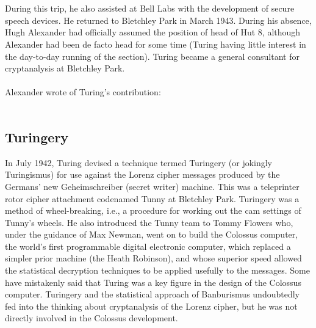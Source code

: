 \documentclass{article}
\begin{document}
\\\\
During this trip, he also assisted at Bell Labs with the development of secure speech devices. He returned to Bletchley Park in March 1943. During his absence, Hugh Alexander had officially assumed the position of head of Hut 8, although Alexander had been de facto head for some time (Turing having little interest in the day-to-day running of the section). Turing became a general consultant for cryptanalysis at Bletchley Park.
\\\\
Alexander wrote of Turing's contribution:
\\\\

\subsection{Turingery}

In July 1942, Turing devised a technique termed Turingery (or jokingly Turingismus) for use against the Lorenz cipher messages produced by the Germans' new Geheimschreiber (secret writer) machine. This was a teleprinter rotor cipher attachment codenamed Tunny at Bletchley Park. Turingery was a method of wheel-breaking, i.e., a procedure for working out the cam settings of Tunny's wheels. He also introduced the Tunny team to Tommy Flowers who, under the guidance of Max Newman, went on to build the Colossus computer, the world's first programmable digital electronic computer, which replaced a simpler prior machine (the Heath Robinson), and whose superior speed allowed the statistical decryption techniques to be applied usefully to the messages. Some have mistakenly said that Turing was a key figure in the design of the Colossus computer. Turingery and the statistical approach of Banburismus undoubtedly fed into the thinking about cryptanalysis of the Lorenz cipher, but he was not directly involved in the Colossus development.
\end{document}
